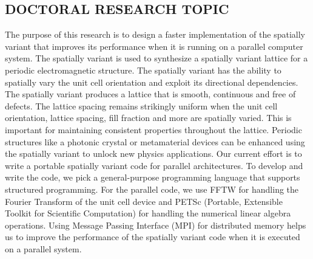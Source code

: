 \documentclass[margin]{res}
\begin{document}
\begin{resume}
\section{DOCTORAL RESEARCH TOPIC}
The purpose of this research is to design a faster implementation of the spatially variant that improves its performance when it is running on a parallel computer system. 
The spatially variant is used to synthesize a spatially variant lattice for a periodic electromagnetic structure. The spatially variant has the ability to spatially vary the unit
cell orientation and exploit its directional dependencies. The spatially variant produces a lattice that is smooth, continuous and free of defects. The lattice spacing remains strikingly
uniform when the unit cell orientation, lattice spacing, fill fraction and more are spatially varied. This is important for maintaining consistent properties throughout the lattice.
Periodic structures like a photonic crystal or metamaterial devices can be enhanced using the spatially variant to unlock new physics applications.
Our current effort is to write a portable spatially variant code for parallel architectures. To develop and write the code, we pick a general-purpose programming language
that supports structured programming. For the parallel code, we use FFTW for handling the Fourier Transform of the unit cell device and PETSc 
(Portable, Extensible Toolkit for Scientific Computation) for handling the numerical linear algebra operations. Using Message Passing Interface (MPI) for distributed memory
helps us to improve the performance of the spatially variant code when it is executed on a parallel system. 


\end{resume}
\end{document}
